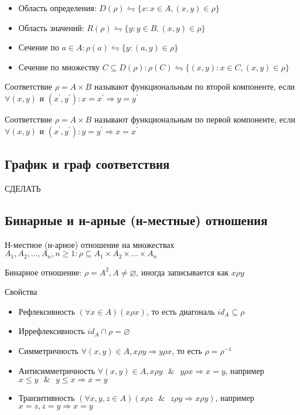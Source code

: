 \documentclass{report}
\newcommand{\band}{\mbox{ } \& \mbox{ }}
\begin{document}
\begin{itemize}
    \item Область определения: $D(\rho) \leftrightharpoons \{x:x \in A, (x,y) \in \rho\}$
    \item Область значений: $R(\rho) \leftrightharpoons \{y:y \in B, (x,y) \in \rho\}$
    \item Сечение по $a \in A: \rho(a) \leftrightharpoons \{y: (a,y) \in \rho\}$
    \item Сечение по множеству $C \subseteq D(\rho): \rho(C) \leftrightharpoons \{(x,y):x \in C, (x,y) \in \rho\}$
\end{itemize}

Соответствие $\rho = A \times B$ называют функциональным по второй компоненте,
если $\forall (x,y)$ и $(x^\prime, y^\prime): x = x^\prime \Rightarrow y = y^\prime$

Соответствие $\rho = A \times B$ называют функциональным по первой компоненте,
если $\forall (x,y)$ и $(x^\prime, y^\prime): y = y^\prime \Rightarrow x = x^\prime$

\subsection{График и граф соответствия}
СДЕЛАТЬ

\subsection{Бинарные и н-арные (н-местные) отношения}

Н-местное (н-арное) отношение на множествах $A_1, A_2, \ldots, A_n, n \geq 1: \rho \subseteq A_1 \times A_2 \times \ldots \times A_n$

Бинарное отношение: $\rho = A^2, A \neq \varnothing$, иногда записывается как $x\rho y$

Свойства
\begin{itemize}
    \item Рефлексивность\newline
          $(\forall x \in A)(x\rho x)$, то есть диагональ $id_A \subseteq \rho$
    \item Иррефлексивность\newline
          $id_A \cap \rho = \varnothing$
    \item Симметричность\newline
          $\forall (x,y) \in A, x\rho y \Rightarrow y\rho x$, то есть $\rho = \rho^{-1}$
    \item  Антисимметричность\newline
          $\forall (x,y) \in A, x\rho y \band y\rho x \Rightarrow x = y$, например $x \leq y \band y \leq x \Rightarrow x = y$
    \item Транзитивность\newline
          $(\forall x,y,z \in A)(x\rho z \band z\rho y \Rightarrow x\rho y)$, например $x = z, z = y \Rightarrow x = y$
\end{itemize}
\end{document}

